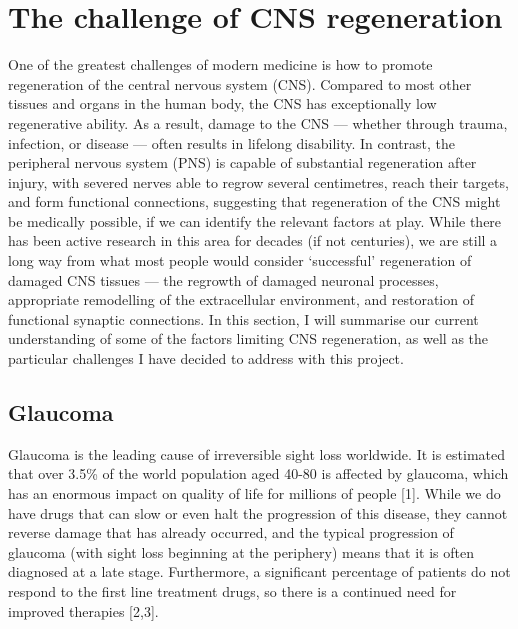 \documentclass[
  12pt,
  a4paper,
]{book}
\begin{document}

\hypertarget{the-challenge-of-cns-regeneration}{%
\section{The challenge of CNS regeneration}\label{the-challenge-of-cns-regeneration}}

One of the greatest challenges of modern medicine is how to promote regeneration of the central nervous system (CNS). Compared to most other tissues and organs in the human body, the CNS has exceptionally low regenerative ability. As a result, damage to the CNS --- whether through trauma, infection, or disease --- often results in lifelong disability. In contrast, the peripheral nervous system (PNS) is capable of substantial regeneration after injury, with severed nerves able to regrow several centimetres, reach their targets, and form functional connections, suggesting that regeneration of the CNS might be medically possible, if we can identify the relevant factors at play. While there has been active research in this area for decades (if not centuries), we are still a long way from what most people would consider `successful' regeneration of damaged CNS tissues --- the regrowth of damaged neuronal processes, appropriate remodelling of the extracellular environment, and restoration of functional synaptic connections. In this section, I will summarise our current understanding of some of the factors limiting CNS regeneration, as well as the particular challenges I have decided to address with this project.

\hypertarget{glaucoma}{%
\subsection{Glaucoma}\label{glaucoma}}

Glaucoma is the leading cause of irreversible sight loss worldwide. It is estimated that over 3.5\% of the world population aged 40-80 is affected by glaucoma, which has an enormous impact on quality of life for millions of people {[}1{]}. While we do have drugs that can slow or even halt the progression of this disease, they cannot reverse damage that has already occurred, and the typical progression of glaucoma (with sight loss beginning at the periphery) means that it is often diagnosed at a late stage. Furthermore, a significant percentage of patients do not respond to the first line treatment drugs, so there is a continued need for improved therapies {[}2,3{]}.
\end{document}
